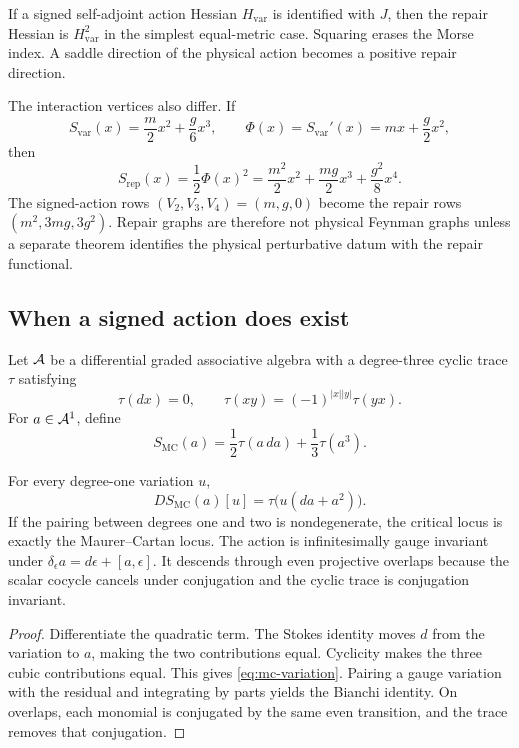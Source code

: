 \documentclass[11pt,a4paper]{article}
\newcommand{\MC}{\mathrm{MC}}
\begin{document}
If a signed self-adjoint action Hessian \(H_{\mathrm{var}}\) is identified
with \(J\), then the repair Hessian is \(H_{\mathrm{var}}^2\) in the simplest
equal-metric case.  Squaring erases the Morse index.  A saddle direction of
the physical action becomes a positive repair direction.

The interaction vertices also differ.  If
\[
S_{\mathrm{var}}(x)=\frac m2x^2+\frac g6x^3,
\qquad
\Phi(x)=S_{\mathrm{var}}'(x)=mx+\frac g2x^2,
\]
then
\[
S_{\mathrm{rep}}(x)=\frac12\Phi(x)^2
=\frac{m^2}{2}x^2+\frac{mg}{2}x^3+\frac{g^2}{8}x^4.
\]
The signed-action rows \((V_2,V_3,V_4)=(m,g,0)\) become the repair rows
\((m^2,3mg,3g^2)\).  Repair graphs are therefore not physical Feynman graphs
unless a separate theorem identifies the physical perturbative datum with
the repair functional.

\subsection{When a signed action does exist}

Let \(\mathcal{A}\) be a differential graded associative algebra with a degree-three
cyclic trace \(\tau\) satisfying
\[
\tau(dx)=0,
\qquad
\tau(xy)=(-1)^{|x||y|}\tau(yx).
\]
For \(a\in\mathcal{A}^1\), define
\begin{equation}
S_{\MC}(a)=\frac12\tau(a\,da)+\frac13\tau(a^3).
\label{eq:mc-action}
\end{equation}

\begin{theorem}
\label{thm:cyclic-action}
For every degree-one variation \(u\),
\begin{equation}
DS_{\MC}(a)[u]=\tau\bigl(u(da+a^2)\bigr).
\label{eq:mc-variation}
\end{equation}
If the pairing between degrees one and two is nondegenerate, the critical
locus is exactly the Maurer--Cartan locus.  The action is infinitesimally
gauge invariant under
\(\delta_\epsilon a=d\epsilon+[a,\epsilon]\).  It descends through even
projective overlaps because the scalar cocycle cancels under conjugation and
the cyclic trace is conjugation invariant.
\end{theorem}

\begin{proof}
Differentiate the quadratic term.  The Stokes identity moves \(d\) from the
variation to \(a\), making the two contributions equal.  Cyclicity makes the
three cubic contributions equal.  This gives \eqref{eq:mc-variation}.
Pairing a gauge variation with the residual and integrating by parts yields
the Bianchi identity.  On overlaps, each monomial is conjugated by the same
even transition, and the trace removes that conjugation.
\end{proof}
\end{document}
